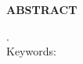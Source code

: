 \begin{center}
  \textbf{ABSTRACT}
\end{center}

\singlespacing

\noindent . \\

\noindent Keywords:

